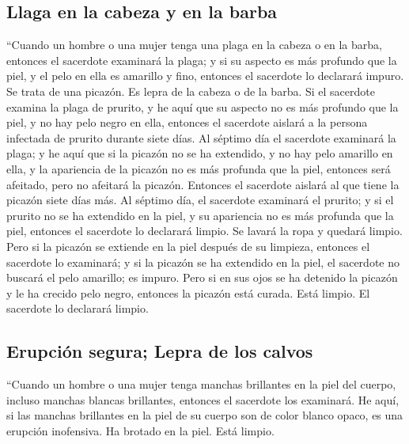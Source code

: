 \hypertarget{llaga-en-la-cabeza-y-en-la-barba}{%
\subsection{Llaga en la cabeza y en la
barba}\label{llaga-en-la-cabeza-y-en-la-barba}}

 ``Cuando un hombre o una mujer tenga una plaga en la
cabeza o en la barba,  entonces el sacerdote examinará la
plaga; y si su aspecto es más profundo que la piel, y el pelo en ella es
amarillo y fino, entonces el sacerdote lo declarará impuro. Se trata de
una picazón. Es lepra de la cabeza o de la barba.  Si el
sacerdote examina la plaga de prurito, y he aquí que su aspecto no es
más profundo que la piel, y no hay pelo negro en ella, entonces el
sacerdote aislará a la persona infectada de prurito durante siete días.
 Al séptimo día el sacerdote examinará la plaga; y he
aquí que si la picazón no se ha extendido, y no hay pelo amarillo en
ella, y la apariencia de la picazón no es más profunda que la piel,
 entonces será afeitado, pero no afeitará la picazón.
Entonces el sacerdote aislará al que tiene la picazón siete días más.
 Al séptimo día, el sacerdote examinará el prurito; y si
el prurito no se ha extendido en la piel, y su apariencia no es más
profunda que la piel, entonces el sacerdote lo declarará limpio. Se
lavará la ropa y quedará limpio.  Pero si la picazón se
extiende en la piel después de su limpieza,  entonces el
sacerdote lo examinará; y si la picazón se ha extendido en la piel, el
sacerdote no buscará el pelo amarillo; es impuro.  Pero
si en sus ojos se ha detenido la picazón y le ha crecido pelo negro,
entonces la picazón está curada. Está limpio. El sacerdote lo declarará
limpio.

\hypertarget{erupciuxf3n-segura-lepra-de-los-calvos}{%
\subsection{Erupción segura; Lepra de los
calvos}\label{erupciuxf3n-segura-lepra-de-los-calvos}}

 ``Cuando un hombre o una mujer tenga manchas brillantes
en la piel del cuerpo, incluso manchas blancas brillantes,
 entonces el sacerdote los examinará. He aquí, si las
manchas brillantes en la piel de su cuerpo son de color blanco opaco, es
una erupción inofensiva. Ha brotado en la piel. Está limpio.

